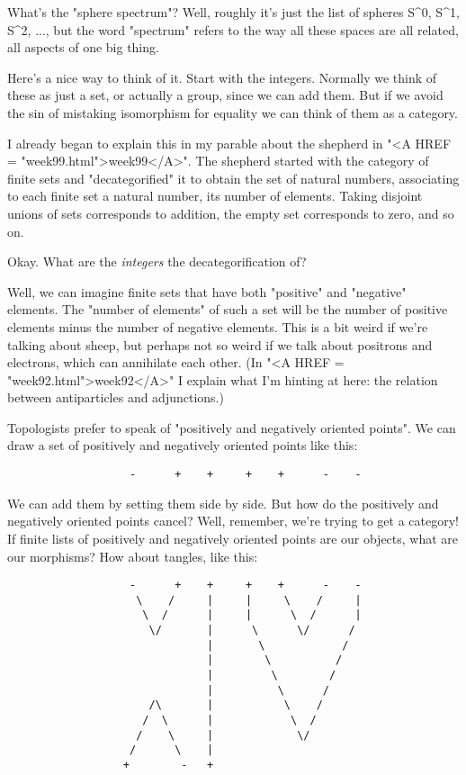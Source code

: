 What's the "sphere spectrum"?  Well, roughly it's just the list
of spheres S^{0}, S^{1}, S^{2}, ..., but the word "spectrum" refers to the
way all these spaces are all related, all aspects of one big thing.

Here's a nice way to think of it.  Start with the integers.  Normally
we think of these as just a set, or actually a group, since we can add
them.  But if we avoid the sin of mistaking isomorphism for equality
we can think of them as a category.  

I already began to explain this in my parable about the shepherd in
"<A HREF = "week99.html">week99</A>".  The shepherd started with the category of finite sets and
"decategorified" it to obtain the set of natural numbers, associating to
each finite set a natural number, its number of elements.  Taking
disjoint unions of sets corresponds to addition, the empty set
corresponds to zero, and so on.

Okay.  What are the \emph{integers} the decategorification of?

Well, we can imagine finite sets that have both "positive" and
"negative" elements.  The "number of elements" of such a set will be the
number of positive elements minus the number of negative elements.  This
is a bit weird if we're talking about sheep, but perhaps not so weird if
we talk about positrons and electrons, which can annihilate each other.
(In "<A HREF = "week92.html">week92</A>" I explain what I'm hinting at here: the relation between
antiparticles and adjunctions.)

Topologists prefer to speak of "positively and negatively oriented
points".  We can draw a set of positively and negatively oriented points
like this:

\begin{verbatim}
                   -      +    +     +    +      -    -

\end{verbatim}
    
We can add them by setting them side by side.  But how do the positively
and negatively oriented points cancel?  Well, remember, we're trying to
get a category!  If finite lists of positively and negatively oriented
points are our objects, what are our morphisms?  How about tangles, like this:

\begin{verbatim}
                   -      +    +     +    +      -    -
                    \    /     |     |     \    /     |
                     \  /      |     |      \  /      |
                      \/       |      \      \/      /
                               |       \            /
                               |        \          /
                               |         \        /
                               |          \      /    
                      /\       |           \    /
                     /  \      |            \  /
                    /    \     |             \/
                   /      \    |
                  +        -   +

\end{verbatim}
    
